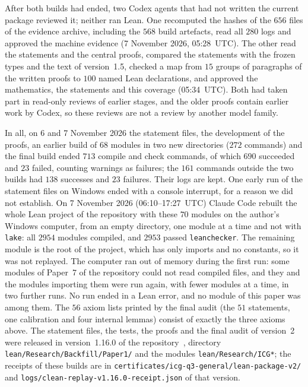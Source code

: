 \documentclass[11pt]{article}
\theoremstyle{remark}
\begin{document}
After both builds had ended, two Codex agents that had not written the current
package reviewed it; neither ran Lean. One recomputed the hashes of the $656$ files
of the evidence archive, including the $568$ build artefacts, read all $280$ logs and
approved the machine evidence (7 November 2026, 05:28~UTC). The other read the
statements and the central proofs, compared the statements with the frozen types and
the text of version~1.5, checked a map from $15$ groups of paragraphs of the written
proofs to $100$ named Lean declarations, and approved the mathematics, the statements
and this coverage (05:34~UTC). Both had taken part in read-only reviews of earlier
stages, and the older proofs contain earlier work by Codex, so these reviews are not
a review by another model family.

In all, on 6 and 7 November 2026 the statement files, the development of the proofs, an earlier build of $68$
modules in two new directories ($272$ commands) and the final build ended $713$ compile
and check commands, of which $690$ succeeded and $23$ failed, counting warnings as
failures; the $161$ commands outside the two builds had $138$ successes and $23$
failures. Their logs are kept. One early run of the statement files on Windows ended with a console
interrupt, for a reason we did not establish.
On 7 November 2026 (06:10--17:27~UTC) Claude Code rebuilt the whole Lean project of
the repository with these $70$ modules on the author's Windows computer, from an empty
directory, one module at a time and not with \texttt{lake}: all $2954$ modules
compiled, and $2953$ passed \texttt{leanchecker}. The remaining module is the root of
the project, which has only imports and no constants, so it was not replayed. The
computer ran out of memory during the first run: some modules of Paper~7 of the
repository could not read compiled files, and they and the modules importing them were
run again, with fewer modules at a time, in two further runs. No run ended in a Lean
error, and no module of this paper was among them. The $56$ axiom lists printed by the
final audit (the $51$ statements, one calibration and four internal lemmas) consist
of exactly the three axioms above. The statement files, the tests, the proofs and
the final audit of version~2 were released in version~1.16.0 of the
repository~\cite{repo}, directory \texttt{lean/Research/Backfill/Paper1/} and the
modules \texttt{lean/Research/ICG*}; the receipts of these builds are in
\texttt{certificates/\allowbreak icg-q3-general/\allowbreak lean-package-v2/} and
\texttt{logs/\allowbreak clean-replay-v1.16.0-receipt.json} of that version.
\end{document}
